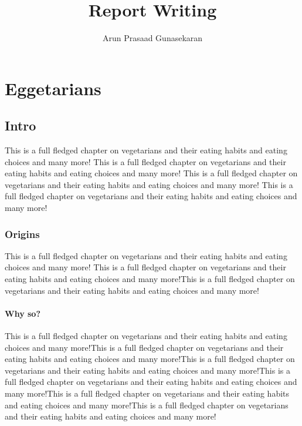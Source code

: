 \documentclass[10pt,a4paper]{report}
\author{Arun Prasaad Gunasekaran}
\title{Report Writing}
\begin{document}
\maketitle

\tableofcontents

\chapter{Eggetarians}

\section{Intro}
This is a full fledged chapter on vegetarians and their eating habits and eating choices and many more! This is a full fledged chapter on vegetarians and their eating habits and eating choices and many more! This is a full fledged chapter on vegetarians and their eating habits and eating choices and many more! This is a full fledged chapter on vegetarians and their eating habits and eating choices and many more!
\subsection{Origins} This is a full fledged chapter on vegetarians and their eating habits and eating choices and many more! This is a full fledged chapter on vegetarians and their eating habits and eating choices and many more!This is a full fledged chapter on vegetarians and their eating habits and eating choices and many more!

\subsubsection{Why so?}

This is a full fledged chapter on vegetarians and their eating habits and eating choices and many more!This is a full fledged chapter on vegetarians and their eating habits and eating choices and many more!This is a full fledged chapter on vegetarians and their eating habits and eating choices and many more!This is a full fledged chapter on vegetarians and their eating habits and eating choices and many more!This is a full fledged chapter on vegetarians and their eating habits and eating choices and many more!This is a full fledged chapter on vegetarians and their eating habits and eating choices and many more!
\end{document}
